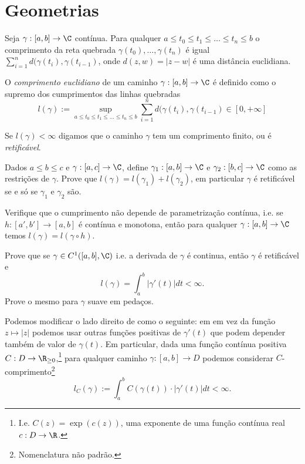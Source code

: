 \section{Geometrias}

Seja $\gamma: [a,b] \to \C$ contínua.
Para qualquer $a\leq t_0 \leq t_1 \leq \dots \leq t_n \leq b$
o comprimento da reta quebrada $\gamma(t_0),\dots,\gamma(t_n)$
é igual $\sum_{i=1}^n d(\gamma(t_i),\gamma(t_{i-1})$,
onde $d(z,w) = |z-w|$ é uma distância euclidiana.

\begin{defin}
O \emph{comprimento euclidiano} de um caminho $\gamma : [a,b] \to \C$
é definido como o supremo dos cumprimentos das linhas quebradas
\begin{equation}
l(\gamma) := \sup_{a\leq t_0 \leq t_1 \leq \dots \leq t_n \leq b} \sum_{i=1}^n d(\gamma(t_i),\gamma(t_{i-1}) \in [0,+\infty] 
\end{equation}

Se $l(\gamma)<\infty$ digamos que o caminho $\gamma$ tem um comprimento finito,
ou é \emph{retificável}.
\end{defin}

\begin{problema}
Dados $a\leq b\leq c$ e $\gamma : [a,c] \to \C$,
define $\gamma_1 : [a,b] \to \C$ e $\gamma_2 : [b,c] \to \C$ como as restrições de $\gamma$.
Prove que $l(\gamma) = l(\gamma_1) + l(\gamma_2)$,
em particular $\gamma$ é retificável se e só se $\gamma_1$ e $\gamma_2$ são.
\end{problema}

\begin{problema}
Verifique que o cumprimento não depende de parametrização contínua, i.e.
se $h: [a',b'] \to [a,b]$ é contínua e monotona, então para qualquer $\gamma: [a,b] \to \C$
temos $l(\gamma) = l(\gamma\circ h)$.
\end{problema}

\begin{problema}
Prove que se $\gamma \in C^1([a,b],\C)$ i.e. a derivada de $\gamma$ é continua,
então $\gamma$ é retificável e
\begin{equation}
\label{eq:dist-integral}
l(\gamma) = \int_a^b |\gamma'(t)| dt < \infty.
\end{equation}
Prove o mesmo para $\gamma$ suave em pedaços.
\end{problema}

Podemos modificar o lado direito de  como o seguinte:
em  em vez da função $z \mapsto |z|$ podemos usar outras funções positivas de $\gamma'(t)$
que podem depender também de valor de $\gamma(t)$.
Em particular, dada uma função contínua positiva $C : D \to \R_{\geq 0}$,\footnote{I.e.
$C(z) = \exp(c(z))$, uma exponente de uma função contínua real $c : D \to \R$.}
para qualquer caminho $\gamma: [a,b] \to D$ podemos considerar $C$-comprimento\footnote{Nomenclatura não padrão.}
\begin{equation}
l_C(\gamma) := \int_a^b C(\gamma(t)) \cdot |\gamma'(t)| dt < \infty.
\end{equation}


